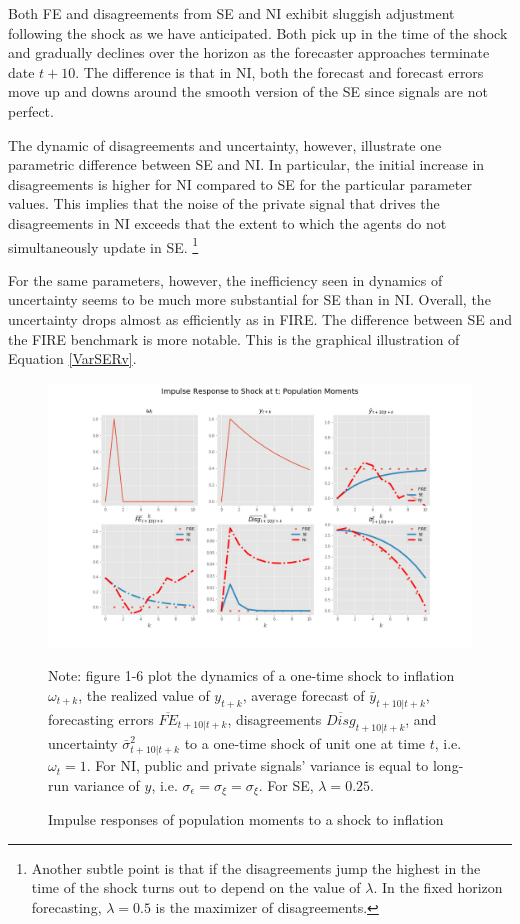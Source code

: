 \documentclass[12pt]{article}
\begin{document}
	
	Both FE and disagreements from SE and NI exhibit sluggish adjustment following the shock as we have anticipated. Both pick up in the time of the shock and gradually declines over the horizon as the forecaster approaches terminate date $t+10$. The difference is that in NI, both the forecast and forecast errors move up and downs around the smooth version of the SE since signals are not perfect. 
	
	The dynamic of disagreements and uncertainty, however,  illustrate one parametric difference between SE and NI. In particular,  the initial increase in disagreements is higher for NI compared to SE for the particular parameter values. This implies that the noise of the private signal that drives the disagreements in NI exceeds that the extent to which the agents do not simultaneously update in SE. \footnote{Another subtle point is that if the disagreements jump the highest in the time of the shock turns out to depend on the value of $\lambda$. In the fixed horizon forecasting, $\lambda=0.5$ is the maximizer of disagreements.}
	
	For the same parameters, however, the inefficiency seen in dynamics of uncertainty seems to be much more substantial for SE than in NI. Overall, the uncertainty drops almost as efficiently as in FIRE. The difference between SE and the FIRE benchmark is more notable. This is the graphical illustration of Equation \ref{VarSERv}. 
	
	
	\begin{figure}[p]
		\centering
		\includegraphics[width=\textwidth]{figures/ir_popseni.png} 
		\begin{flushleft}
			{\footnotesize Note: figure 1-6 plot the dynamics of a one-time shock to inflation $\omega_{t+k}$, the realized value of $y_{t+k}$,  average forecast of $\bar y_{t+10|t+k}$, forecasting errors $\overline{FE}_{t+10|t+k}$, disagreements $\overline {Disg}_{t+10|t+k}$, and uncertainty $\bar \sigma^2_{t+10|t+k}$ to a one-time shock  of unit one at time $t$, i.e. $\omega_t=1$. For NI, public and private signals’ variance is equal to long-run variance of $y$, i.e. $\sigma_\epsilon = \sigma_\xi = \sigma_\xi $. For SE, $\lambda = 0.25$.  }
		\end{flushleft}
		\caption{Impulse responses of population moments to a shock to inflation}
		\label{ir_pop}
	\end{figure}
	
\end{document}
